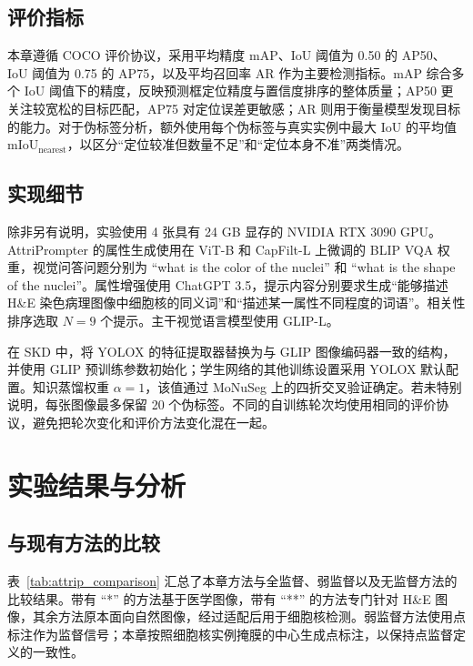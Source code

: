\subsection{评价指标}

本章遵循 COCO 评价协议，采用平均精度 mAP、IoU 阈值为 0.50 的 AP50、IoU 阈值为 0.75 的 AP75，以及平均召回率 AR 作为主要检测指标。mAP 综合多个 IoU 阈值下的精度，反映预测框定位精度与置信度排序的整体质量；AP50 更关注较宽松的目标匹配，AP75 对定位误差更敏感；AR 则用于衡量模型发现目标的能力。对于伪标签分析，额外使用每个伪标签与真实实例中最大 IoU 的平均值 $\mathrm{mIoU}_{\mathrm{nearest}}$，以区分“定位较准但数量不足”和“定位本身不准”两类情况。

\subsection{实现细节}

除非另有说明，实验使用 4 张具有 24 GB 显存的 NVIDIA RTX 3090 GPU。AttriPrompter 的属性生成使用在 ViT-B 和 CapFilt-L 上微调的 BLIP VQA 权重，视觉问答问题分别为 ``what is the color of the nuclei'' 和 ``what is the shape of the nuclei''。属性增强使用 ChatGPT 3.5，提示内容分别要求生成“能够描述 H\&E 染色病理图像中细胞核的同义词”和“描述某一属性不同程度的词语”。相关性排序选取 $N=9$ 个提示。主干视觉语言模型使用 GLIP-L。

在 SKD 中，将 YOLOX 的特征提取器替换为与 GLIP 图像编码器一致的结构，并使用 GLIP 预训练参数初始化；学生网络的其他训练设置采用 YOLOX 默认配置。知识蒸馏权重 $\alpha=1$，该值通过 MoNuSeg 上的四折交叉验证确定。若未特别说明，每张图像最多保留 20 个伪标签。不同的自训练轮次均使用相同的评价协议，避免把轮次变化和评价方法变化混在一起。

\section{实验结果与分析}

\subsection{与现有方法的比较}

表~\ref{tab:attrip_comparison} 汇总了本章方法与全监督、弱监督以及无监督方法的比较结果。带有 ``*'' 的方法基于医学图像，带有 ``**'' 的方法专门针对 H\&E 图像，其余方法原本面向自然图像，经过适配后用于细胞核检测。弱监督方法使用点标注作为监督信号；本章按照细胞核实例掩膜的中心生成点标注，以保持点监督定义的一致性。

